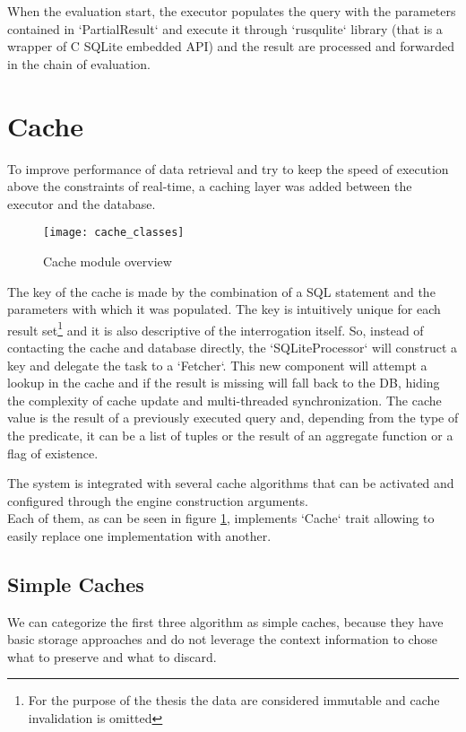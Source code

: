 When the evaluation start, the executor populates the query with the parameters contained in `PartialResult` and execute it through `rusqulite` library (that is a wrapper of C SQLite embedded API) and the result are processed and forwarded in the chain of evaluation.

\section{Cache}
To improve performance of data retrieval and try to keep the speed of execution above the constraints of real-time, a caching layer was added between the executor and the database.
\begin{figure}[h]
  \centering
  \texttt{[image: cache\_classes]}
  \caption{Cache module overview}
  \label{fig:cache_classes}
\end{figure}

The key of the cache is made by the combination of a SQL statement and the parameters with which it was populated. The key is intuitively unique for each result set\footnote{For the purpose of the thesis the data are considered immutable and cache invalidation is omitted} and it is also descriptive of the interrogation itself. So, instead of contacting the cache and database directly, the `SQLiteProcessor` will construct a key and delegate the task to a `Fetcher`. This new component will attempt a lookup in the cache and if the result is missing will fall back to the DB, hiding the complexity of cache update and multi-threaded synchronization.
The cache value is the result of a previously executed query and, depending from the type of the predicate, it can be a list of tuples or the result of an aggregate function or a flag of existence.

The system is integrated with several cache algorithms that can be activated and configured through the engine construction arguments.\\
Each of them, as can be seen in figure \ref{fig:cache_classes}, implements `Cache` trait allowing to easily replace one implementation with another.\\

\subsection{Simple Caches}
We can categorize the first three algorithm as simple caches, because they have basic storage approaches and do not leverage the context information to chose what to preserve and what to discard.
